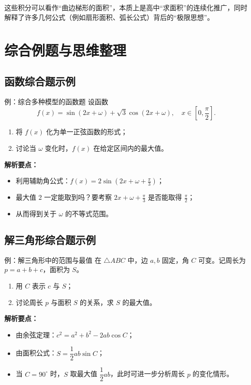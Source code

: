 \documentclass[a4paper,11pt]{ctexart}
\begin{document}
这些积分可以看作“曲边梯形的面积”，本质上是高中“求面积”的连续化推广，同时解释了许多几何公式（例如扇形面积、弧长公式）背后的“极限思想”。

\section{综合例题与思维整理}

\subsection{函数综合题示例}

\begin{examplebox}[mathnote coverage=soft]{例：综合多种模型的函数题}
设函数
\[
f(x) = \sin(2x+\omega) + \sqrt{3}\cos(2x+\omega),
\quad x\in\left[0,\frac{\pi}{2}\right].
\]
\begin{enumerate}
  \item 将 $f(x)$ 化为单一正弦函数的形式；
  \item 讨论当 $\omega$ 变化时，$f(x)$ 在给定区间内的最大值。
\end{enumerate}
\par\textbf{解析要点：}
\begin{itemize}
  \item 利用辅助角公式：$f(x)=2\sin(2x+\omega+\frac{\pi}{3})$；
  \item 最大值 $2$ 一定能取到吗？要考察 $2x+\omega+\frac{\pi}{3}$ 是否能取得 $\frac{\pi}{2}$；
  \item 从而得到关于 $\omega$ 的不等式范围。
\end{itemize}
\end{examplebox}

\subsection{解三角形综合题示例}

\begin{examplebox}[mathnote coverage=soft]{例：解三角形中的范围与最值}
在 $\triangle ABC$ 中，边 $a,b$ 固定，角 $C$ 可变。记周长为 $p=a+b+c$，面积为 $S$。
\begin{enumerate}
  \item 用 $C$ 表示 $c$ 与 $S$；
  \item 讨论周长 $p$ 与面积 $S$ 的关系，求 $S$ 的最大值。
\end{enumerate}
\par\textbf{解析要点：}
\begin{itemize}
  \item 由余弦定理：$c^2=a^2+b^2-2ab\cos C$；
  \item 由面积公式：$S=\dfrac{1}{2}ab\sin C$；
  \item 当 $C=90^\circ$ 时，$S$ 取最大值 $\dfrac{1}{2}ab$，此时可进一步分析周长 $p$ 的变化情形。
\end{itemize}
\end{examplebox}
\end{document}
